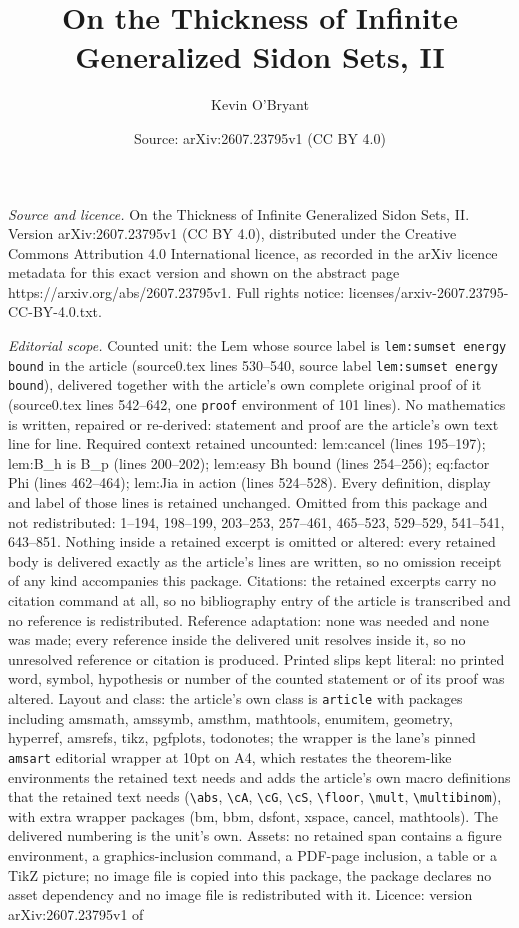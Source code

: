 \documentclass[10pt,a4paper]{amsart}
\title[On the Thickness of Infinite Generalized Sidon Sets, II]{On the Thickness of Infinite Generalized Sidon Sets, II}
\author{Kevin O'Bryant}
\date{Source: arXiv:2607.23795v1 (CC BY 4.0)}
\begin{document}
\maketitle

\noindent\emph{Source and licence.} On the Thickness of Infinite Generalized Sidon Sets, II. Version arXiv:2607.23795v1 (CC BY 4.0), distributed under the Creative Commons Attribution 4.0 International licence, as recorded in the arXiv licence metadata for this exact version and shown on the abstract page https://arxiv.org/abs/2607.23795v1. Full rights notice: licenses/arxiv-2607.23795-CC-BY-4.0.txt.\par\smallskip

\noindent\textit{Editorial scope.} Counted unit: the Lem whose source label is \texttt{lem:sumset energy bound} in the article (source0.tex lines 530--540, source label \texttt{lem:sumset energy bound}), delivered together with the article's own complete original proof of it (source0.tex lines 542--642, one \texttt{proof} environment of 101 lines). No mathematics is written, repaired or re-derived: statement and proof are the article's own text line for line. Required context retained uncounted: lem:cancel (lines 195--197); lem:B\_h is B\_p (lines 200--202); lem:easy Bh bound (lines 254--256); eq:factor Phi (lines 462--464); lem:Jia in action (lines 524--528). Every definition, display and label of those lines is retained unchanged. Omitted from this package and not redistributed: 1--194, 198--199, 203--253, 257--461, 465--523, 529--529, 541--541, 643--851. Nothing inside a retained excerpt is omitted or altered: every retained body is delivered exactly as the article's lines are written, so no omission receipt of any kind accompanies this package. Citations: the retained excerpts carry no citation command at all, so no bibliography entry of the article is transcribed and no reference is redistributed. Reference adaptation: none was needed and none was made; every reference inside the delivered unit resolves inside it, so no unresolved reference or citation is produced. Printed slips kept literal: no printed word, symbol, hypothesis or number of the counted statement or of its proof was altered. Layout and class: the article's own class is \texttt{article} with packages including amsmath, amssymb, amsthm, mathtools, enumitem, geometry, hyperref, amsrefs, tikz, pgfplots, todonotes; the wrapper is the lane's pinned \texttt{amsart} editorial wrapper at 10pt on A4, which restates the theorem-like environments the retained text needs and adds the article's own macro definitions that the retained text needs (\texttt{\textbackslash abs}, \texttt{\textbackslash cA}, \texttt{\textbackslash cG}, \texttt{\textbackslash cS}, \texttt{\textbackslash floor}, \texttt{\textbackslash mult}, \texttt{\textbackslash multibinom}), with extra wrapper packages (bm, bbm, dsfont, xspace, cancel, mathtools). The delivered numbering is the unit's own. Assets: no retained span contains a figure environment, a graphics-inclusion command, a PDF-page inclusion, a table or a TikZ picture; no image file is copied into this package, the package declares no asset dependency and no image file is redistributed with it. Licence: version arXiv:2607.23795v1 of 
\end{document}
